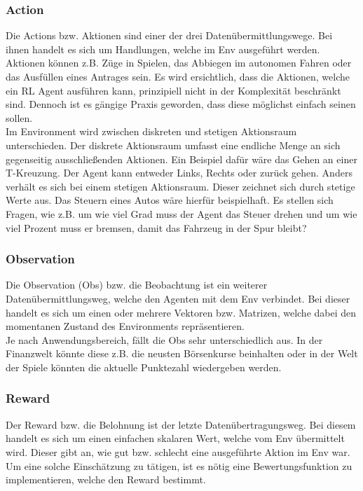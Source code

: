 \subsubsection{Action} \label{subsubsec:Grundlagen_Action}
Die Actions bzw. Aktionen sind einer der drei Datenübermittlungswege. Bei ihnen handelt es sich um Handlungen, welche im Env ausgeführt werden. Aktionen können z.B. Züge in Spielen, das Abbiegen im autonomen Fahren oder das Ausfüllen eines Antrages sein. Es wird ersichtlich, dass die Aktionen, welche ein RL Agent ausführen kann, prinzipiell nicht in der Komplexität beschränkt sind. 
Dennoch ist es gängige Praxis geworden, dass diese möglichst einfach seinen sollen.\\
Im Environment wird zwischen diskreten und stetigen Aktionsraum unterschieden. Der diskrete Aktionsraum umfasst eine endliche Menge an sich gegenseitig ausschließenden Aktionen. Ein Beispiel dafür wäre das Gehen an einer T-Kreuzung. Der Agent kann entweder Links, Rechts oder zurück gehen.
Anders verhält es sich bei einem stetigen Aktionsraum. Dieser zeichnet sich durch stetige Werte aus. Das Steuern eines Autos wäre hierfür beispielhaft. Es stellen sich Fragen, wie z.B. um wie viel Grad muss der Agent das Steuer drehen und um wie viel Prozent muss er bremsen, damit das Fahrzeug in der Spur bleibt? \citep[S. 31 f.]{DRL_Lapan}

\subsubsection{Observation} \label{subsubsec:Grundlagen_Observation}
Die Observation (Obs) bzw. die Beobachtung ist ein weiterer Datenübermittlungsweg, welche den Agenten mit dem Env verbindet. Bei dieser handelt es sich um einen oder mehrere Vektoren bzw. Matrizen, welche dabei den momentanen Zustand des Environments repräsentieren. \citep[S. 381]{Sutton1998}\\
Je nach Anwendungsbereich, fällt die Obs sehr unterschiedlich aus. In der Finanzwelt könnte diese z.B. die neusten Börsenkurse beinhalten oder in der Welt der Spiele könnten die aktuelle Punktezahl wiedergeben werden. \citep[S. 32]{DRL_Lapan}

\subsubsection{Reward} \label{subsubsec:Grundlagen_Reward}
Der Reward bzw. die Belohnung ist der letzte Datenübertragungsweg.
Bei diesem handelt es sich um einen einfachen skalaren Wert, welche vom Env übermittelt wird. Dieser gibt an, wie gut bzw. schlecht eine ausgeführte Aktion im Env war. \citep[S. 42]{Sutton1998}\\
Um eine solche Einschätzung zu tätigen, ist es nötig eine Bewertungsfunktion zu implementieren, welche den Reward bestimmt.

